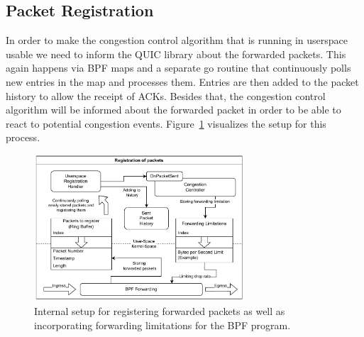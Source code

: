 \subsection{Packet Registration}
In order to make the congestion control algorithm that is running in userspace
usable we need to inform the QUIC library about the forwarded packets.
This again happens via BPF maps and a separate go routine that continuously
polls new entries in the map and processes them.
Entries are then added to the packet history to allow the receipt of ACKs.
Besides that, the congestion control algorithm will be informed about the
forwarded packet in order to be able to react to potential congestion events.
Figure~\ref{fig:forward-registration} visualizes the setup for this process.
\begin{figure}[H]
    \centering
    \includegraphics[width=0.7\textwidth]{figures/03_fast_relays/forward-registration.drawio.pdf}
    \caption[Packet registration schematic]{Internal setup for registering forwarded packets as well as incorporating forwarding
    limitations for the BPF program.}\label{fig:forward-registration}
\end{figure}

